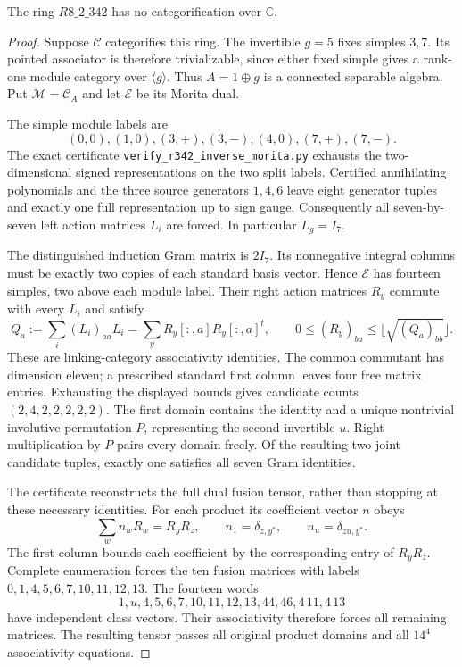\begin{proposition}\label{prop:r342-morita}
The ring $R8\_2\_342$ has no categorification over $\mathbb C$.
\end{proposition}
\begin{proof}
Suppose $\mathcal C$ categorifies this ring. The invertible
$g=5$ fixes simples $3,7$. Its pointed associator is therefore
trivializable, since either fixed simple gives a rank-one
module category over $\langle g\rangle$. Thus $A=1\oplus g$
is a connected separable algebra. Put $\mathcal M=\mathcal C_A$
and let $\mathcal E$ be its Morita dual.

The simple module labels are
\[
(0,0),(1,0),(3,+),(3,-),(4,0),(7,+),(7,-).
\]
The exact certificate \texttt{verify\_r342\_inverse\_morita.py}
exhausts the two-dimensional signed representations on the
two split labels. Certified annihilating polynomials and the
three source generators $1,4,6$ leave eight generator tuples
and exactly one full representation up to sign gauge.
Consequently all seven-by-seven left action matrices $L_i$
are forced. In particular $L_g=I_7$.

The distinguished induction Gram matrix is $2I_7$. Its
nonnegative integral columns must be exactly two copies of
each standard basis vector. Hence $\mathcal E$ has fourteen
simples, two above each module label. Their right action
matrices $R_y$ commute with every $L_i$ and satisfy
\[
Q_a:=\sum_i(L_i)_{aa}L_i
 =\sum_yR_y[:,a]R_y[:,a]^t,
\qquad
0\le(R_y)_{ba}\le\lfloor\sqrt{(Q_a)_{bb}}\rfloor.
\]
These are linking-category associativity identities.
The common commutant has dimension eleven; a prescribed
standard first column leaves four free matrix entries.
Exhausting the displayed bounds gives candidate counts
$(2,4,2,2,2,2,2)$. The first domain contains the identity
and a unique nontrivial involutive permutation $P$, representing
the second invertible $u$. Right multiplication by $P$ pairs
every domain freely. Of the resulting two joint candidate
tuples, exactly one satisfies all seven Gram identities.

The certificate reconstructs the full dual fusion tensor,
rather than stopping at these necessary identities. For each
product its coefficient vector $n$ obeys
\[
\sum_wn_wR_w=R_yR_z,\qquad
n_1=\delta_{z,y^*},\qquad n_u=\delta_{zu,y^*}.
\]
The first column bounds each coefficient by the corresponding
entry of $R_yR_z$. Complete enumeration forces the ten fusion
matrices with labels $0,1,4,5,6,7,10,11,12,13$.
The fourteen words
\[
1,u,4,5,6,7,10,11,12,13,44,46,4\,11,4\,13
\]
have independent class vectors. Their associativity therefore
forces all remaining matrices. The resulting tensor passes
all original product domains and all $14^4$ associativity
equations.


\end{proof}
